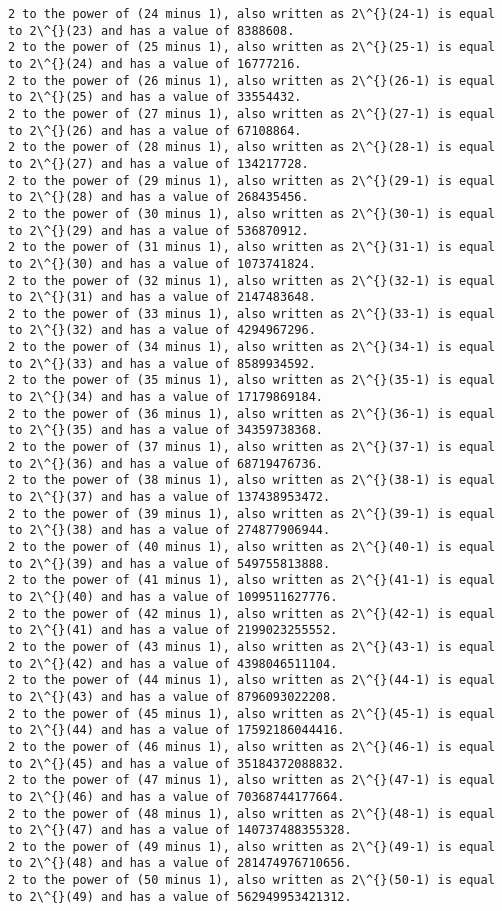 \documentclass[11pt]{article}
\begin{document}
\begin{Verbatim}[commandchars=\\\{\}]
2 to the power of (24 minus 1), also written as 2\^{}(24-1) is equal to 2\^{}(23) and has a value of 8388608.
2 to the power of (25 minus 1), also written as 2\^{}(25-1) is equal to 2\^{}(24) and has a value of 16777216.
2 to the power of (26 minus 1), also written as 2\^{}(26-1) is equal to 2\^{}(25) and has a value of 33554432.
2 to the power of (27 minus 1), also written as 2\^{}(27-1) is equal to 2\^{}(26) and has a value of 67108864.
2 to the power of (28 minus 1), also written as 2\^{}(28-1) is equal to 2\^{}(27) and has a value of 134217728.
2 to the power of (29 minus 1), also written as 2\^{}(29-1) is equal to 2\^{}(28) and has a value of 268435456.
2 to the power of (30 minus 1), also written as 2\^{}(30-1) is equal to 2\^{}(29) and has a value of 536870912.
2 to the power of (31 minus 1), also written as 2\^{}(31-1) is equal to 2\^{}(30) and has a value of 1073741824.
2 to the power of (32 minus 1), also written as 2\^{}(32-1) is equal to 2\^{}(31) and has a value of 2147483648.
2 to the power of (33 minus 1), also written as 2\^{}(33-1) is equal to 2\^{}(32) and has a value of 4294967296.
2 to the power of (34 minus 1), also written as 2\^{}(34-1) is equal to 2\^{}(33) and has a value of 8589934592.
2 to the power of (35 minus 1), also written as 2\^{}(35-1) is equal to 2\^{}(34) and has a value of 17179869184.
2 to the power of (36 minus 1), also written as 2\^{}(36-1) is equal to 2\^{}(35) and has a value of 34359738368.
2 to the power of (37 minus 1), also written as 2\^{}(37-1) is equal to 2\^{}(36) and has a value of 68719476736.
2 to the power of (38 minus 1), also written as 2\^{}(38-1) is equal to 2\^{}(37) and has a value of 137438953472.
2 to the power of (39 minus 1), also written as 2\^{}(39-1) is equal to 2\^{}(38) and has a value of 274877906944.
2 to the power of (40 minus 1), also written as 2\^{}(40-1) is equal to 2\^{}(39) and has a value of 549755813888.
2 to the power of (41 minus 1), also written as 2\^{}(41-1) is equal to 2\^{}(40) and has a value of 1099511627776.
2 to the power of (42 minus 1), also written as 2\^{}(42-1) is equal to 2\^{}(41) and has a value of 2199023255552.
2 to the power of (43 minus 1), also written as 2\^{}(43-1) is equal to 2\^{}(42) and has a value of 4398046511104.
2 to the power of (44 minus 1), also written as 2\^{}(44-1) is equal to 2\^{}(43) and has a value of 8796093022208.
2 to the power of (45 minus 1), also written as 2\^{}(45-1) is equal to 2\^{}(44) and has a value of 17592186044416.
2 to the power of (46 minus 1), also written as 2\^{}(46-1) is equal to 2\^{}(45) and has a value of 35184372088832.
2 to the power of (47 minus 1), also written as 2\^{}(47-1) is equal to 2\^{}(46) and has a value of 70368744177664.
2 to the power of (48 minus 1), also written as 2\^{}(48-1) is equal to 2\^{}(47) and has a value of 140737488355328.
2 to the power of (49 minus 1), also written as 2\^{}(49-1) is equal to 2\^{}(48) and has a value of 281474976710656.
2 to the power of (50 minus 1), also written as 2\^{}(50-1) is equal to 2\^{}(49) and has a value of 562949953421312.

    \end{Verbatim}
\end{document}
